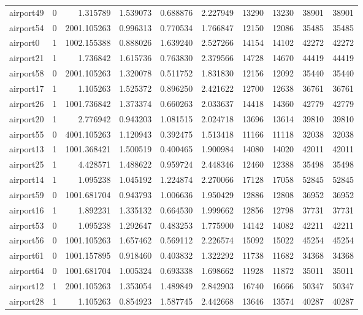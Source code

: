 \begin{longtable}{|l|r|r|r|r|r|r|r|r|r|}
airport49 & 0 & 1.315789 & 1.539073 & 0.688876 & 2.227949 & 13290 & 13230 & 38901 & 38901 \\
airport54 & 0 & 2001.105263 & 0.996313 & 0.770534 & 1.766847 & 12150 & 12086 & 35485 & 35485 \\
airport0 & 1 & 1002.155388 & 0.888026 & 1.639240 & 2.527266 & 14154 & 14102 & 42272 & 42272 \\
airport21 & 1 & 1.736842 & 1.615736 & 0.763830 & 2.379566 & 14728 & 14670 & 44419 & 44419 \\
airport58 & 0 & 2001.105263 & 1.320078 & 0.511752 & 1.831830 & 12156 & 12092 & 35440 & 35440 \\
airport17 & 1 & 1.105263 & 1.525372 & 0.896250 & 2.421622 & 12700 & 12638 & 36761 & 36761 \\
airport26 & 1 & 1001.736842 & 1.373374 & 0.660263 & 2.033637 & 14418 & 14360 & 42779 & 42779 \\
airport20 & 1 & 2.776942 & 0.943203 & 1.081515 & 2.024718 & 13696 & 13614 & 39810 & 39810 \\
airport55 & 0 & 4001.105263 & 1.120943 & 0.392475 & 1.513418 & 11166 & 11118 & 32038 & 32038 \\
airport13 & 1 & 1001.368421 & 1.500519 & 0.400465 & 1.900984 & 14080 & 14020 & 42011 & 42011 \\
airport25 & 1 & 4.428571 & 1.488622 & 0.959724 & 2.448346 & 12460 & 12388 & 35498 & 35498 \\
airport14 & 1 & 1.095238 & 1.045192 & 1.224874 & 2.270066 & 17128 & 17058 & 52845 & 52845 \\
airport59 & 0 & 1001.681704 & 0.943793 & 1.006636 & 1.950429 & 12886 & 12808 & 36952 & 36952 \\
airport16 & 1 & 1.892231 & 1.335132 & 0.664530 & 1.999662 & 12856 & 12798 & 37731 & 37731 \\
airport53 & 0 & 1.095238 & 1.292647 & 0.483253 & 1.775900 & 14142 & 14082 & 42211 & 42211 \\
airport56 & 0 & 1001.105263 & 1.657462 & 0.569112 & 2.226574 & 15092 & 15022 & 45254 & 45254 \\
airport61 & 0 & 1001.157895 & 0.918460 & 0.403832 & 1.322292 & 11738 & 11682 & 34368 & 34368 \\
airport64 & 0 & 1001.681704 & 1.005324 & 0.693338 & 1.698662 & 11928 & 11872 & 35011 & 35011 \\
airport12 & 1 & 2001.105263 & 1.353054 & 1.489849 & 2.842903 & 16740 & 16666 & 50347 & 50347 \\
airport28 & 1 & 1.105263 & 0.854923 & 1.587745 & 2.442668 & 13646 & 13574 & 40287 & 40287 \\

\end{longtable}
